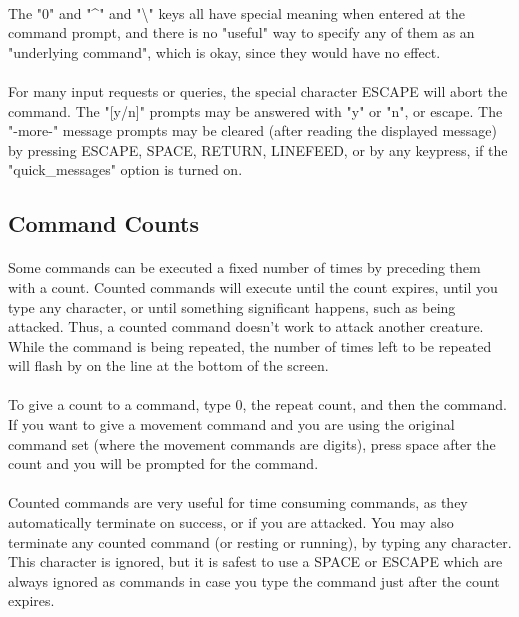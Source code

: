\paragraph{}The "0" and "\^{}" and "\textbackslash " keys all have special meaning when entered
at the command prompt, and there is no "useful" way to specify any of them
as an "underlying command", which is okay, since they would have no effect.

\paragraph{}For many input requests or queries, the special character ESCAPE
will abort the command. The "[y/n]" prompts may be answered with "y" or
"n", or escape. The "-more-" message prompts may be cleared (after reading
the displayed message) by pressing ESCAPE, SPACE, RETURN, LINEFEED, or by
any keypress, if the "quick\_messages" option is turned on.
 

\subsection{Command Counts}
\paragraph{}Some commands can be executed a fixed number of times by preceding
them with a count. Counted commands will execute until the count expires,
until you type any character, or until something significant happens, such
as being attacked. Thus, a counted command doesn't work to attack another
creature. While the command is being repeated, the number of times left
to be repeated will flash by on the line at the bottom of the screen.

\paragraph{}To give a count to a command, type 0, the repeat count, and then
the command. If you want to give a movement command and you are using the
original command set (where the movement commands are digits), press space
after the count and you will be prompted for the command.
 
\paragraph{}Counted commands are very useful for time consuming commands, as
they automatically terminate on success, or if you are attacked. You may
also terminate any counted command (or resting or running), by typing any
character. This character is ignored, but it is safest to use a SPACE or
ESCAPE which are always ignored as commands in case you type the command
just after the count expires.

